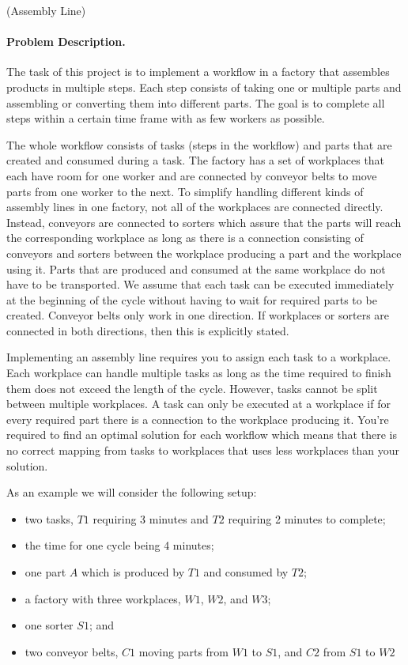 \documentclass[a4paper,12pt]{article}
\begin{document}
\begin{PraktikumsAufgabe}{2}{(Assembly Line)}
\vspace*{-4mm}
\paragraph{Problem Description.}
%
%
The task of this project is to implement a workflow in a factory that assembles products in multiple steps.
Each step consists of taking one or multiple parts and assembling or converting them into different parts.
The goal is to complete all steps within a certain time frame with as few workers as possible.

The whole workflow consists of tasks (steps in the workflow)
and parts that are created and consumed during a task.
The factory has a set of workplaces that each have room for one worker
and are connected by conveyor belts to move parts from one worker to the next.
To simplify handling different kinds of assembly lines in one factory,
not all of the workplaces are connected directly.
Instead, conveyors are connected to sorters which assure that the parts will reach the corresponding workplace
as long as there is a connection consisting of conveyors and sorters between the workplace producing a part
and the workplace using it.
Parts that are produced and consumed at the same workplace do not have to be transported.
We assume that each task can be executed immediately at the beginning of the cycle
without having to wait for required parts to be created.
Conveyor belts only work in one direction. If workplaces or sorters are connected in both directions, 
then this is explicitly stated.

Implementing an assembly line requires you to assign each task to a workplace.
Each workplace can handle multiple tasks as long as the time required to finish them does not exceed the length of the cycle.
However, tasks cannot be split between multiple workplaces.
A task can only be executed at a workplace if for every required part there is a connection to the workplace producing it.
You're required to find an optimal solution for each workflow which means
that there is no correct mapping from tasks to workplaces that uses less workplaces than your solution.

\noindent
As an example we will consider the following setup:
\vspace{-3mm}
\begin{itemize}
    \item two tasks, $T1$ requiring 3 minutes and $T2$ requiring 2 minutes to complete;
    \item the time for one cycle being 4 minutes;
    \item one part $A$ which is produced by $T1$ and consumed by $T2$;
    \item a factory with three workplaces, $W1$, $W2$, and $W3$;
    \item one sorter $S1$; and
    \item two conveyor belts, $C1$ moving parts from $W1$ to $S1$, and $C2$ from $S1$ to $W2$
\end{itemize}


\end{PraktikumsAufgabe}
\end{document}
